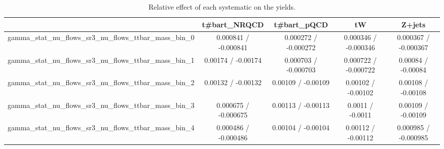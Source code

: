 \documentclass[10pt]{article}
\begin{document}
\begin{table}[htbp]
\begin{center}
\begin{tabular}{|c|c|c|c|c|}
\hline 
      & t#bar{t}_{NRQCD}      & t#bar{t}_{pQCD}      & tW      & Z+jets \\ 
\hline 
  gamma_stat_nu_flows_sr3_nu_flows_ttbar_mass_bin_0 & 0.000841 / -0.000841 & 0.000272 / -0.000272 & 0.000346 / -0.000346 & 0.000367 / -0.000367 \\ 
  gamma_stat_nu_flows_sr3_nu_flows_ttbar_mass_bin_1 & 0.00174 / -0.00174 & 0.000703 / -0.000703 & 0.000722 / -0.000722 & 0.00084 / -0.00084 \\ 
  gamma_stat_nu_flows_sr3_nu_flows_ttbar_mass_bin_2 & 0.00132 / -0.00132 & 0.00109 / -0.00109 & 0.00102 / -0.00102 & 0.00108 / -0.00108 \\ 
  gamma_stat_nu_flows_sr3_nu_flows_ttbar_mass_bin_3 & 0.000675 / -0.000675 & 0.00113 / -0.00113 & 0.0011 / -0.0011 & 0.00109 / -0.00109 \\ 
  gamma_stat_nu_flows_sr3_nu_flows_ttbar_mass_bin_4 & 0.000486 / -0.000486 & 0.00104 / -0.00104 & 0.00112 / -0.00112 & 0.000985 / -0.000985 \\ 
\hline 
\end{tabular} 
\caption{Relative effect of each systematic on the yields.} 
\end{center} 
\end{table} 
\end{document}
